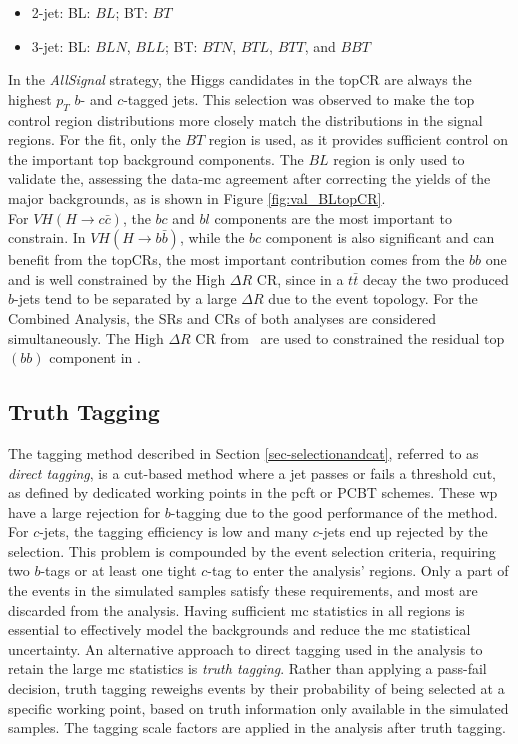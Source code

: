 \begin{itemize}
\item 2-jet: \quad BL: $BL$;  \quad BT: $BT$
\item 3-jet: \quad BL: $BLN$, $BLL$;  \quad BT: $BTN$, $BTL$, $BTT$, and $BBT$
\end{itemize}
In the \textit{AllSignal} strategy, the Higgs candidates in the topCR are always the highest $p_T$ $b$- and $c$-tagged jets. This selection was observed to make the top control region distributions more closely match the distributions in the signal regions. For the fit, only the $BT$ region is used, as it provides sufficient control on the important top background components. The $BL$ region is only used to validate the, assessing the data-\gls{mc} agreement after correcting the yields of the major backgrounds, as is shown in Figure \ref{fig:val_BLtopCR}. \\


For $VH(H\rightarrow c\bar{c})$, the $bc$ and $bl$ components are the most important to constrain. In $VH(H\rightarrow b\bar{b})$, while the $bc$ component is also significant and can benefit from the topCRs, the most important contribution comes from the $bb$ one and is well constrained by the High $\Delta R$ CR, since in a $t\bar{t}$ decay the two produced $b$-jets tend to be separated by a large $\Delta R$ due to the event topology. For the Combined Analysis, the SRs and CRs of both analyses are considered simultaneously. The High $\Delta R$ CR from \vhb\ are used to constrained the residual top$(bb)$ component in \vhc. \\

\newpage
\subsection{Truth Tagging}\label{app-truth-tagging}
The tagging method described in Section \ref{sec-selectionandcat}, referred to as \textit{direct tagging}, is a cut-based method where a jet passes or fails a threshold cut, as defined by dedicated working points in the \gls{pcft} or PCBT schemes. These \gls{wp} have a large rejection for $b$-tagging due to the good performance of the method. For $c$-jets, the tagging efficiency is low and many $c$-jets end up rejected by the selection. This problem is compounded by the event selection criteria, requiring two $b$-tags or at least one tight $c$-tag to enter the analysis' regions. Only a part of the events in the simulated samples satisfy these requirements, and most are discarded from the analysis. Having sufficient \gls{mc} statistics in all regions is essential to effectively model the backgrounds and reduce the \gls{mc} statistical uncertainty. An alternative approach to direct tagging used in the analysis to retain the large \gls{mc} statistics is \textit{truth tagging}. Rather than applying a pass-fail decision, truth tagging reweighs events by their probability of being selected at a specific working point, based on truth information only available in the simulated samples. The tagging scale factors are applied in the analysis after truth tagging. \\

